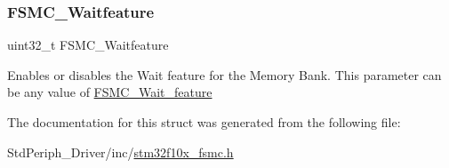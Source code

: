 \subsubsection{\texorpdfstring{FSMC\_Waitfeature}{FSMC\_Waitfeature}}
{\footnotesize\ttfamily uint32\+\_\+t F\+S\+M\+C\+\_\+\+Waitfeature}

Enables or disables the Wait feature for the Memory Bank. This parameter can be any value of \mbox{\hyperlink{group___f_s_m_c___wait__feature}{F\+S\+M\+C\+\_\+\+Wait\+\_\+feature}} 

The documentation for this struct was generated from the following file\+:\begin{DoxyCompactItemize}
\item 
Std\+Periph\+\_\+\+Driver/inc/\mbox{\hyperlink{stm32f10x__fsmc_8h}{stm32f10x\+\_\+fsmc.\+h}}\end{DoxyCompactItemize}

